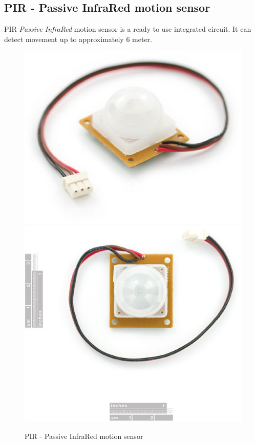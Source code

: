 \documentclass[12pt,a4paper,draft]{report}
\begin{document}
\subsection{PIR - Passive InfraRed motion sensor}
PIR \textit{Passive InfraRed} motion sensor is a ready to use integrated circuit. It can detect movement up to approximately 6 meter.
\ \\
\begin{figure}[H]
\centering
\includegraphics*[scale=0.2]{pir}
\includegraphics*[scale=0.2]{pir_2}
\caption{PIR - Passive InfraRed motion sensor}
\end{figure}
\end{document}
